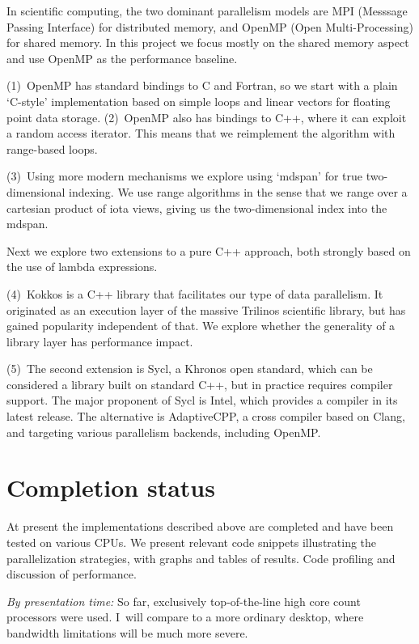 \documentclass[11pt,fleqn]{artikel3}
\begin{document}
In scientific computing, the two dominant parallelism models are MPI
(Messsage Passing Interface) for distributed memory,
and OpenMP (Open Multi-Processing) for shared memory.
In this project we focus mostly on the shared memory aspect and use OpenMP
as the performance baseline.

(1)~OpenMP has standard bindings to C and Fortran, so we start with a
plain `C-style' implementation
based on simple loops and linear vectors for floating point data storage.
(2)~OpenMP also has bindings to C++, where it can exploit a random access iterator.
This means that we reimplement the algorithm with range-based loops.

(3)~Using more modern mechanisms we explore using `mdspan' for true two-dimensional indexing.
We use range algorithms in the sense that
we range over a cartesian product of iota views,
giving us the two-dimensional index into the mdspan.

Next we explore two extensions to a pure C++ approach,
both strongly based on the use of lambda expressions.

(4)~Kokkos is a C++ library that facilitates our type of data parallelism.
It originated as an execution layer of the massive Trilinos scientific library,
but has gained popularity independent of that.
We explore whether the generality of a library layer has performance impact.

(5)~The second extension is Sycl, a Khronos open standard, which can be considered
a library built on standard C++, but in practice requires compiler support.
The major proponent of Sycl is Intel, which provides a compiler in its latest release.
The alternative is AdaptiveCPP, a cross compiler based on Clang, and targeting
various parallelism backends, including OpenMP.

\section*{Completion status}

At present the implementations described above
are completed and have been tested on various CPUs.
We present relevant code snippets
illustrating the parallelization strategies,
with graphs and tables of results.
Code profiling and discussion of performance.

\textsl{By presentation time:}
%
So far, exclusively top-of-the-line high core count processors were used.
I~will compare to a more ordinary desktop, where 
bandwidth limitations will be much more severe.
\end{document}
